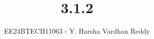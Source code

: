 \documentclass[journal]{IEEEtran}
\begin{document}
	
	
	\vspace{3cm}
	
	\title{3.1.2}
	\author{EE24BTECH11063 - Y. Harsha Vardhan Reddy }
	{\let\newpage\relax\maketitle}
	
	\renewcommand{\thefigure}{\theenumi}
	\renewcommand{\thetable}{\theenumi}
	\setlength{\intextsep}{10pt} %
	
	
	\renewcommand{\thetable}{\theenumi}
	
\end{document}
